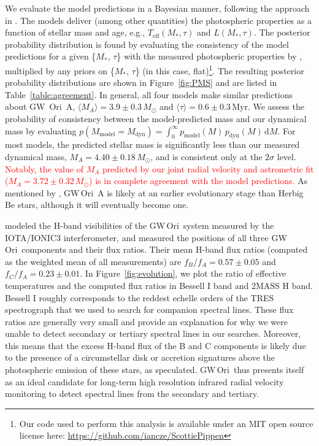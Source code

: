 \documentclass[twocolumn]{aastex61}
\newcommand{\todo}[1]{ \textcolor{red}{#1}}
\newcommand{\gw}{GW\,Ori}
\begin{document}
We evaluate the model predictions in a Bayesian manner, following the approach in \citet{jorgensen05,rosenfeld12b,czekala15a}. The models deliver (among other quantities) the photospheric properties as a function of stellar mass and age,
e.g., $T_\mathrm{eff}(M_\ast, \tau)$ and $L(M_\ast, \tau)$.
The posterior probability distribution is found by evaluating the consistency of the model predictions for a given \{$M_\ast$, $\tau$\} with the measured photospheric properties by \citet{fang14}, multiplied by any priors on  \{$M_\ast$, $\tau$\} (in this case, flat)\footnote{Our code used to perform this analysis is available under an MIT open source license here: \url{https://github.com/iancze/ScottiePippen}}.
The resulting posterior probability distributions are shown in Figure~\ref{fig:PMS} and are listed in Table~\ref{table:agreement}. In general, all four models make similar predictions about GW~Ori~A, $\langle M_A \rangle = 3.9 \pm 0.3\,M_\odot$ and $\langle \tau \rangle = 0.6 \pm 0.3\,$Myr. We assess the probability of consistency between the model-predicted mass and our dynamical mass by evaluating $p(M_\mathrm{model} = M_\mathrm{dyn}) = \int_0^\infty p_\mathrm{model}(M) \, p_\mathrm{dyn}(M) \, \mathrm{d}M$. For most models, the predicted stellar mass is significantly less than our measured dynamical mass, $M_A = 4.40 \pm 0.18\,M_\odot$, and is consistent only at the $2\sigma$ level. \todo{Notably, the value of $M_A$ predicted by our joint radial velocity and astrometric fit ($M_A = 3.72 \pm 0.32\,M_\odot$) is in complete agreement with the model predictions.} As mentioned by \citet{fang14}, \gw~A is likely at an earlier evolutionary stage than Herbig Be stars, although it will eventually become one.

\citet{berger11} modeled the H-band visibilities of the \gw\ system measured by the IOTA/IONIC3 interferometer, and measured the positions of all three \gw\ components and their flux ratios. Their mean H-band flux ratios (computed as the weighted mean of all measurements) are $f_B/f_A = 0.57 \pm 0.05$ and $f_C/f_A = 0.23 \pm 0.01$. In Figure~\ref{fig:evolution}, we plot the ratio of effective temperatures and the computed flux ratios in Bessell I band and 2MASS H band. Bessell I roughly corresponds to the reddest echelle orders of the TRES spectrograph that we used to search for companion spectral lines. These flux ratios are generally very small and provide an explanation for why we were unable to detect secondary or tertiary spectral lines in our searches. Moreover, this means that the excess H-band flux of the B and C components is likely due to the presence of a circumstellar disk or accretion signatures above the photospheric emission of these stars, as \citet{berger11} speculated. \gw\ thus presents itself as an ideal candidate for long-term high resolution infrared radial velocity monitoring to detect spectral lines from the secondary and tertiary.
\end{document}
